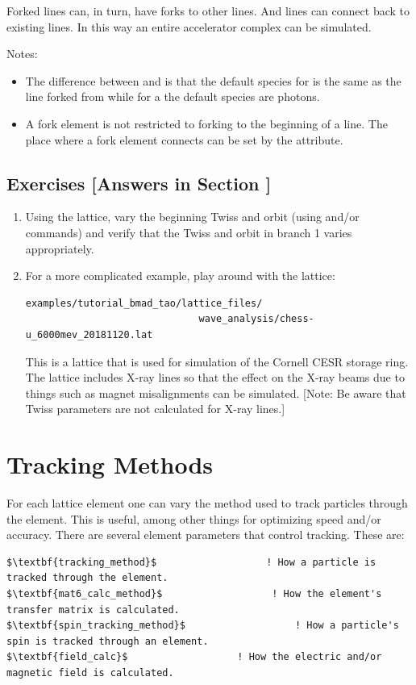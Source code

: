 \documentclass{hitec}     %
\newcommand{\Section}[1]{\section{#1}\vspace*{-1ex}}
\begin{document}
Forked lines can, in turn, have forks to other lines. And lines can connect back to existing lines. In this
way an entire accelerator complex can be simulated. 

Notes:
\vspace{-5 pt}
\begin{itemize}
\item
The difference between  and  is that the default species for  is
the same as the line forked from while for a  the default species are photons.
\item
A fork element is not restricted to forking to the beginning of a line.  The place where a fork
element connects can be set by the  attribute.
\end{itemize}


\subsection{Exercises [Answers in Section ]}
\label{s:fork.ex}

\begin{enumerate}[label=\thesection.\arabic{enumi}]
\item
Using the  lattice, vary the beginning Twiss and orbit (using  and/or
 commands) and verify that the Twiss and orbit in branch 1 varies appropriately.
%
\item
For a more complicated example, play around with the lattice:
\begin{lstlisting}[mathescape]
examples/tutorial_bmad_tao/lattice_files/
                              wave_analysis/chess-u_6000mev_20181120.lat
\end{lstlisting}
This is a lattice that is used for simulation of the Cornell CESR storage ring. The lattice includes
X-ray lines so that the effect on the X-ray beams due to things such as magnet misalignments can
be simulated. [Note: Be aware that Twiss parameters are not calculated for X-ray lines.]
\end{enumerate}

\newpage

\Section{Tracking Methods}
\label{s:methods}

For each lattice element one can vary the method used to track particles through the element. This is
useful, among other things for optimizing speed and/or accuracy. There are several element parameters
that control tracking. These are:
\begin{lstlisting}[mathescape]
$\textbf{tracking_method}$                   ! How a particle is tracked through the element.
$\textbf{mat6_calc_method}$                   ! How the element's transfer matrix is calculated.
$\textbf{spin_tracking_method}$                   ! How a particle's spin is tracked through an element.
$\textbf{field_calc}$                   ! How the electric and/or magnetic field is calculated.
\end{lstlisting}
\end{document}
